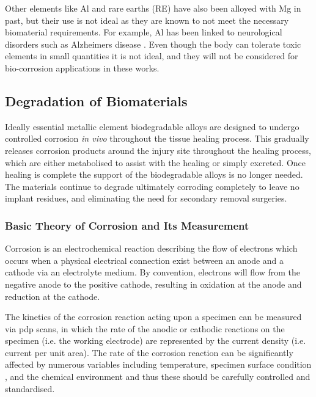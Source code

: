 \documentclass[a4paper,12pt,oneside]{report}%
\begin{document}
Other elements like Al and rare earths (RE) have also been alloyed with Mg in past, but their use is not ideal as they are known to not meet the necessary biomaterial requirements. For example, Al has been linked to neurological disorders such as Alzheimers disease \cite{Zheng2014}. Even though the body can tolerate toxic elements in small quantities it is not ideal, and they will not be considered for bio-corrosion applications in these works. 

\subsection{Degradation of Biomaterials} 
Ideally essential metallic element biodegradable alloys are designed to undergo controlled corrosion \textit{in vivo} throughout the tissue healing process. This gradually releases corrosion products around the injury site throughout the healing process, which are either metabolised to assist with the healing or simply excreted. Once healing is complete the support of the biodegradable alloys is no longer needed. The materials continue to degrade ultimately corroding completely to leave no implant residues, and eliminating the need for secondary removal surgeries. 

\subsubsection{Basic Theory of Corrosion and Its Measurement}
Corrosion is an electrochemical reaction describing the flow of electrons which occurs when a physical electrical connection exist between an anode and a cathode via an electrolyte medium. By convention, electrons will flow from the negative anode to the positive cathode,  resulting in oxidation at the anode and reduction at the cathode. 

The kinetics of the corrosion reaction acting upon a specimen can be measured via \gls{pdp} scans, in which the rate of the anodic or cathodic reactions on the specimen (i.e. the working electrode) are represented by the current density (i.e. current per unit area). The rate of the corrosion reaction can be significantly affected by numerous variables including temperature, specimen surface condition \cite{Jones1992}, and the chemical environment and thus these should be carefully controlled and standardised. 
\end{document}
